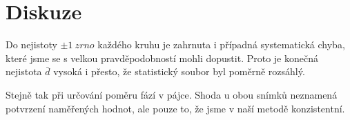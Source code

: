 \section*{Diskuze}
Do nejistoty $\pm \SI{1}{zrno}$ každého kruhu je zahrnuta i případná systematická chyba, které jsme se s velkou pravděpodobností mohli dopustit. Proto je konečná nejistota $\bar{d}$ vysoká i přesto, že statistický soubor byl poměrně rozsáhlý.

Stejně tak při určování poměru fází v pájce. Shoda u obou snímků neznamená potvrzení naměřených hodnot, ale pouze to, že jsme v naší metodě konzistentní.